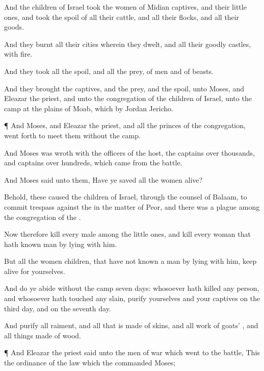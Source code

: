 {And the
children of
Israel took
{} the
women of
Midian
captives, and their little
ones, and took the
spoil of all their
cattle, and all their
flocks, and all their
goods.

And they
burnt all their
cities wherein they
dwelt, and all their goodly
castles, with
fire.

And they
took all the
spoil, and all the
prey,
{} of
men and of
beasts.

And they
brought the
captives, and the
prey, and the
spoil, unto
Moses, and
Eleazar the
priest, and unto the
congregation of the
children of
Israel, unto the
camp at the
plains of
Moab, which
{} by
Jordan
{}
Jericho.


\par }{\PP {}¶ And
Moses, and
Eleazar the
priest, and all the
princes of the
congregation, went
forth to
meet them
without the
camp.

And
Moses was
wroth with the
officers of the
host,
{} the
captains over
thousands, and
captains over
hundreds, which
came
from the
battle.

And
Moses
said unto them, Have ye
saved all the
women
alive?

Behold,
these
caused the
children of
Israel, through the
counsel of
Balaam, to
commit
trespass against the
{} in the
matter of
Peor, and there was a
plague among the
congregation of the
{}.

Now therefore
kill every
male among the little
ones, and
kill every
woman that hath
known
man by
lying with
him.

But all the
women
children, that have not
known a
man by
lying with him, keep
alive for yourselves.

And do ye
abide
without the
camp
seven
days: whosoever hath
killed any
person, and whosoever hath
touched any
slain,
purify
{} yourselves and your
captives on the
third
day, and on the
seventh
day.

And
purify all
{}
raiment, and all that is
made of
skins, and all
work of
goats’
{}, and all things
made of
wood.


\par }{\PP {}¶ And
Eleazar the
priest
said unto the
men of
war which
went to the
battle, This
{} the
ordinance of the
law which the
{}
commanded
Moses;

}

